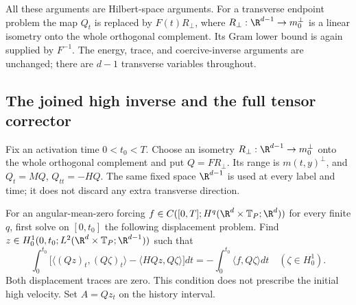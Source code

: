 All these arguments are Hilbert-space arguments. For a transverse
endpoint problem the map $Q_t$ is replaced by $F(t)R_\perp$, where
$R_\perp:\R^{d-1}\to m_0^\perp$ is a linear isometry onto the whole
orthogonal complement. Its Gram lower bound is again supplied by
$F^{-1}$. The energy, trace, and coercive-inverse arguments are unchanged;
there are $d-1$ transverse variables throughout.

\subsection{The joined high inverse and the full tensor corrector}
Fix an activation time $0<t_0<T$. Choose an isometry
$R_\perp:\R^{d-1}\to m_0^\perp$ onto the whole orthogonal complement
and put $Q=FR_\perp$. Its range is $m(t,y)^\perp$, and
$Q_t=MQ$, $Q_{tt}=-HQ$. The same fixed space $\R^{d-1}$ is used at
every label and time; it does not discard any extra transverse direction.

For an angular-mean-zero forcing
$f\in C([0,T];H^q(\R^d\times\mathbb T_P;\R^d))$ for every finite $q$,
first solve on $[0,t_0]$ the following displacement problem. Find
$z\in H^1_0(0,t_0;L^2(\R^d\times\mathbb T_P;\R^{d-1}))$ such that
\begin{equation}\label{eq:packet-high-history}
 \int_0^{t_0}\!\bigl[\langle (Qz)_t,(Q\zeta)_t\rangle
            -\langle HQz,Q\zeta\rangle\bigr]dt
       =-\int_0^{t_0}\!\langle f,Q\zeta\rangle dt
 \quad(\zeta\in H^1_0).
\end{equation}
Both displacement traces are zero. This condition does not prescribe the
initial high velocity. Set $A=Qz_t$ on the history interval.

